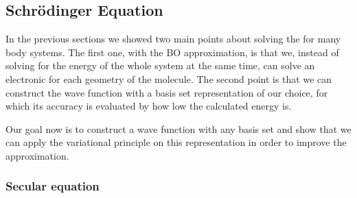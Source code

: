 \documentclass[../master_thesis.tex]{subfiles}
\begin{document}
\subsection{Schrödinger Equation}
In the previous sections we showed two main points about solving the \SE for
many body systems. The first one, with the \ac{BO} approximation, is that we,
instead of solving for the energy of the whole system at the same time, can solve an electronic
\SE for each geometry of the molecule. The second point is that we can construct
the wave function with a basis set representation of our choice, for which its
accuracy is evaluated by how low the calculated energy is.

Our goal now is to construct a wave function with any basis set and show that we
can apply the variational principle on this representation in order to improve
the approximation.

\subsubsection{Secular equation}
\end{document}
